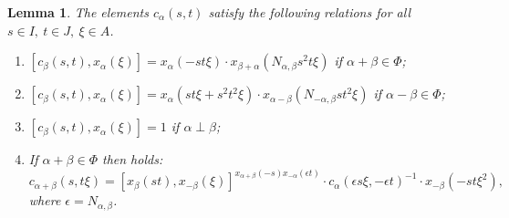 \documentclass[oneside, 8pt]{amsart}
\newtheorem{lemma}{Lemma}
\theoremstyle{remark}
\theoremstyle{definition}
\numberwithin{equation}{section}
\begin{document}
\begin{lemma} \label{Crels}
The elements $c_\alpha(s, t)$ satisfy the following relations for all $s\in I,\ t\in J,\ \xi\in A$.
 \begin{enumerate}
 \item \label{C1} $[c_\beta(s, t), x_{\alpha}(\xi)] = x_{\alpha}(- st\xi) \cdot x_{\beta+\alpha}(N_{\alpha,\beta}s^2t\xi)$ if $\alpha+\beta \in \Phi$;
 \item \label{C2} $[c_\beta(s, t), x_{\alpha}(\xi)] = x_{\alpha}(st\xi + s^2t^2\xi) \cdot x_{\alpha-\beta}(N_{-\alpha, \beta}st^2\xi)$ if $\alpha-\beta \in \Phi$;  
 \item \label{C3} $[c_\beta(s, t), x_{\alpha}(\xi)] = 1$ if $\alpha \perp \beta$;  
 \item \label{C4} If $\alpha+\beta\in\Phi$ then holds:
  \[c_{\alpha+\beta}(s, t\xi) = [x_{\beta}(st), x_{-\beta}(\xi)] ^ {x_{\alpha+\beta}(-s) x_{-\alpha}(\epsilon t)} \cdot c_{\alpha}(\epsilon s\xi, -\epsilon t)^{-1} \cdot x_{-\beta}(-st\xi^2),\]
  where $\epsilon = N_{\alpha,\beta}$.
 \end{enumerate}
\end{lemma}
\end{document}
